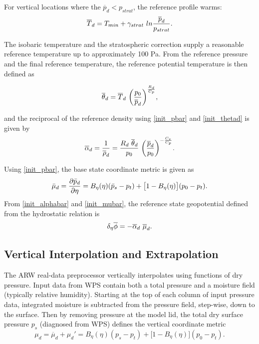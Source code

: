 \noindent For vertical locations where the $\overline{p}_d < p_{strat}$, the reference profile warms:
\begin{equation}
\overline{T}_d = T_{min} + \gamma_{strat}~ln {\overline{p}_d \over p_{strat}}.
\notag
\end{equation}

\noindent The isobaric temperature and the stratospheric correction supply a 
reasonable reference temperature up to approximately 100 Pa. 
From the reference pressure and the final reference temperature, 
the reference potential temperature is then defined as

\noindent
\begin{equation}
\overline{\theta}_d = \overline{T}_d~{\bigg( {p_0 \over \overline{p}_d } \bigg) }
^{R_d \over C_p},
\label{init_thetad}
\end{equation}

\noindent and the reciprocal of the reference density using 
\eqref{init_pbar} and \eqref{init_thetad} is given by
\begin{equation}
\overline{\alpha}_d = {1 \over \overline{\rho}_d} = {{R_d ~\overline{\theta}_d}\over p_{0} }~\bigg( 
{\overline{p}_d \over p_{0} } \bigg)^{-{C_v \over C_p}}.
\label{init_alphabar}
\end{equation}

\noindent Using \eqref{init_pbar}, the base state coordinate metric is given as
%
\begin{equation}
\bar\mu_d= {\partial \bar p_d\over\partial\eta} = B_\eta(\eta)(\bar p_s-p_t)+\bigl[1-B_\eta(\eta)\bigr](p_0-p_t).
\label{init_mubar}
\end{equation}
%
\noindent 
From \eqref{init_alphabar} and \eqref{init_mubar}, 
the reference state geopotential defined from the hydrostatic relation is
\begin{equation}
\delta_{\eta} \overline{\phi}  = -\overline{\alpha}_d~\overline{\mu}_d.
\notag
\end{equation}


\subsection{Vertical Interpolation and Extrapolation}

The ARW real-data preprocessor vertically interpolates using functions of dry pressure.
Input data from WPS contain both a total pressure and a moisture field (typically
relative humidity).  Starting at the top of each column of input pressure data, integrated moisture
is subtracted from the pressure field, step-wise, down to the surface.  
Then by removing pressure at the model
lid, the total dry surface pressure $p_{s}$ (diagnosed from WPS) defines the vertical coordinate metric
\begin{equation}
\mu_d = \overline{\mu}_d + \mu_d' = B_\eta(\eta)(p_s-p_t)+\bigl[1-B_\eta(\eta)\bigr](p_0-p_t).
\label{init_mutotal}
\end{equation}

